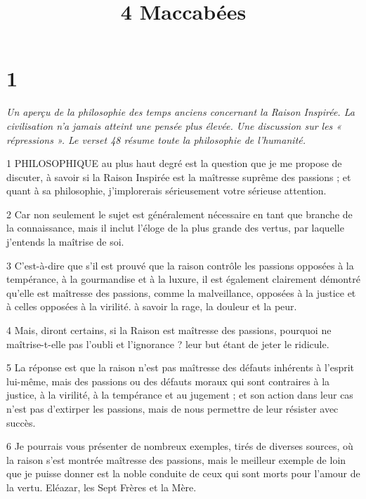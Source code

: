 

\title{4 Maccabées}

\chapter{1}

\par \textit{Un aperçu de la philosophie des temps anciens concernant la Raison Inspirée. La civilisation n’a jamais atteint une pensée plus élevée. Une discussion sur les « répressions ». Le verset 48 résume toute la philosophie de l'humanité.}

\par 1 PHILOSOPHIQUE au plus haut degré est la question que je me propose de discuter, à savoir si la Raison Inspirée est la maîtresse suprême des passions ; et quant à sa philosophie, j'implorerais sérieusement votre sérieuse attention.

\par 2 Car non seulement le sujet est généralement nécessaire en tant que branche de la connaissance, mais il inclut l'éloge de la plus grande des vertus, par laquelle j'entends la maîtrise de soi.

\par 3 C'est-à-dire que s'il est prouvé que la raison contrôle les passions opposées à la tempérance, à la gourmandise et à la luxure, il est également clairement démontré qu'elle est maîtresse des passions, comme la malveillance, opposées à la justice et à celles opposées à la virilité. à savoir la rage, la douleur et la peur.

\par 4 Mais, diront certains, si la Raison est maîtresse des passions, pourquoi ne maîtrise-t-elle pas l'oubli et l'ignorance ? leur but étant de jeter le ridicule.

\par 5 La réponse est que la raison n'est pas maîtresse des défauts inhérents à l'esprit lui-même, mais des passions ou des défauts moraux qui sont contraires à la justice, à la virilité, à la tempérance et au jugement ; et son action dans leur cas n'est pas d'extirper les passions, mais de nous permettre de leur résister avec succès.

\par 6 Je pourrais vous présenter de nombreux exemples, tirés de diverses sources, où la raison s'est montrée maîtresse des passions, mais le meilleur exemple de loin que je puisse donner est la noble conduite de ceux qui sont morts pour l'amour de la vertu. Eléazar, les Sept Frères et la Mère.

